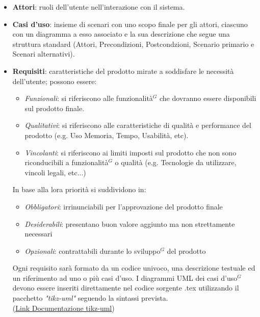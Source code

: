 \documentclass[a4paper,10pt]{article}
\begin{document}
\begin{itemize}
  \item \textbf{Attori}: ruoli dell'utente nell'interazione con il sistema.
  \item \textbf{Casi d'uso}: insieme di scenari con uno scopo finale per gli attori, ciascuno con un diagramma a esso 
  associato e la sua descrizione che segue una struttura standard 
  (Attori, Precondizioni, Postcondzioni, Scenario primario e Scenari alternativi).
  \item \textbf{Requisiti}: caratteristiche del prodotto mirate a soddisfare le necessità dell'utente; 
  possono essere:
  \begin{itemize}
    \item \textit{Funzionali}: si riferiscono alle funzionalità$^G$ che dovranno essere disponibili sul prodotto finale.
    \item \textit{Qualitativi}: si riferiscono alle caratteristiche di qualità e performance del prodotto 
    (e.g. Uso Memoria, Tempo, Usabilità, etc).
    \item \textit{Vincolanti}: si riferiscono ai limiti imposti sul prodotto che non sono riconducibili a funzionalità$^G$ o qualità 
    (e.g. Tecnologie da utilizzare, vincoli legali, etc...)
  \end{itemize}
  In base alla lora priorità si suddividono in:
  \begin{itemize}
  \item \textit{Obbligatori}: irrinunciabili per l'approvazione del prodotto finale
  \item \textit{Desiderabili}: presentano buon valore aggiunto ma non strettamente necessari 
  \item \textit{Opzionali}: contrattabili durante lo sviluppo$^G$ del prodotto
  \end{itemize}
  Ogni requisito sarà formato da un codice univoco, una descrizione testuale ed un riferimento ad uno o più casi d'uso.
  I diagrammi UML dei casi d'uso$^G$ devono essere inseriti direttamente nel codice sorgente .tex utilizzando il pacchetto
  \textit{"tikz-uml"} seguendo la sintassi prevista. \\
  (\href{https://perso.ensta.fr/~kielbasi/tikzuml/var/files/doc/tikzumlmanual.pdf}{\underline{Link Documentazione tikz-uml}})

\end{itemize}
\end{document}
